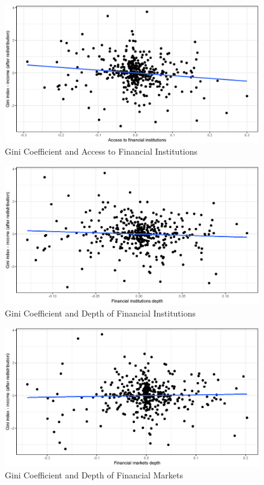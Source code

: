 \documentclass[a4paper,11pt]{article}
\begin{document}
\begin{figure}
    \caption{Gini Coefficient and Access to Financial Institutions}
\includegraphics[width=\textwidth, keepaspectratio]{figures/FIAGiniNet_dm}
\end{figure}

\begin{figure}
    \caption{Gini Coefficient and Depth of Financial Institutions}
\includegraphics[width=\textwidth, keepaspectratio]{figures/FIDGiniNet_dm}
\end{figure}

\begin{figure}
    \caption{Gini Coefficient and Depth of Financial Markets}
\includegraphics[width=\textwidth, keepaspectratio]{figures/FMDGiniNet_dm}
\end{figure}
\end{document}

